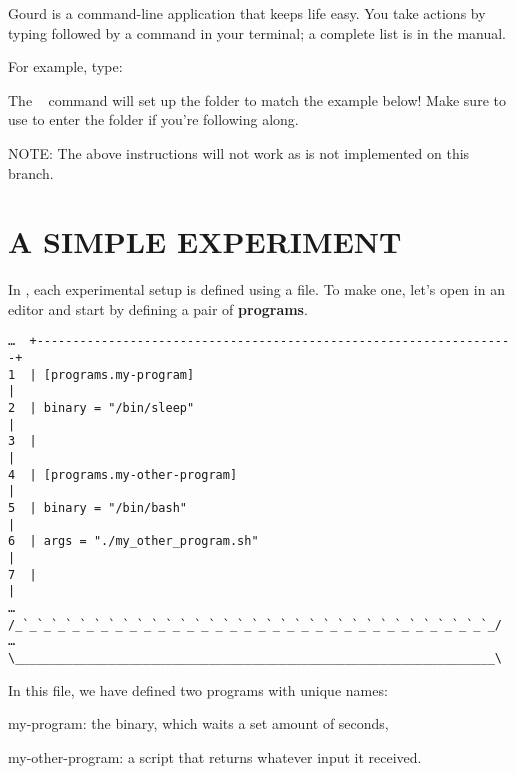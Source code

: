 \documentclass[a4paper,english]{article}
\begin{document}
\begin{adjustwidth}{18pt}{0pt}
    Gourd is a command-line application that keeps life easy.
    You take actions by typing  followed by a command in your terminal;
    a complete list is in the manual.

    For example, type:
    ~~~~

    The ~ command will set up the  folder to match
    the example below!
    Make sure to use  to enter the folder if you're following along.

    NOTE: The above instructions will not work as  is not implemented on this branch.


    \section{A SIMPLE EXPERIMENT}

    In , each experimental setup is defined using a  file.
    To make one, let's open  in an editor and start by defining a pair
    of \textbf{programs}.

    \begin{verbatim}
…  +-------------------------------------------------------------------+
1  | [programs.my-program]                                             |
2  | binary = "/bin/sleep"                                             |
3  |                                                                   |
4  | [programs.my-other-program]                                       |
5  | binary = "/bin/bash"                                              |
6  | args = "./my_other_program.sh"                                    |
7  |                                                                   |
…  /_`_`_`_`_`_`_`_`_`_`_`_`_`_`_`_`_`_`_`_`_`_`_`_`_`_`_`_`_`_`_`_`_`_/
…  \___________________________________________________________________\
    \end{verbatim}

    In this file, we have defined two programs with unique names:
    \begin{Description}[programs]\setlength{\itemsep}{0cm}
    \item[my-program:] the  binary, which waits a set amount of seconds,
    \item[my-other-program:] a \File{bash} script that returns whatever input it received.
    \end{Description}


\end{adjustwidth}
\end{document}
